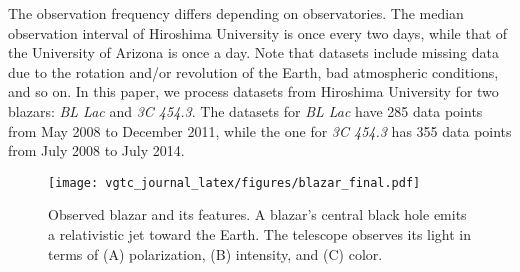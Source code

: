 The observation frequency differs depending on observatories.
The median observation interval of Hiroshima University is once every two days,
while that of the University of Arizona is once a day.
Note that datasets include missing data due to the rotation and/or revolution of the Earth, bad atmospheric conditions, and so on.
In this paper, we process datasets from Hiroshima University for two blazars: \emph{BL Lac} and \emph{3C 454.3}. 
The datasets for \emph{BL Lac} have 285 data points from May 2008 to December 2011, while the one for \emph{3C 454.3} has 355 data points from July 2008 to July 2014.


\begin{figure}[tb]
    \centering
        \texttt{[image: vgtc\_journal\_latex/figures/blazar\_final.pdf]}
    \caption{Observed blazar and its features. A blazar's central black hole emits a relativistic jet toward the Earth.
        The telescope observes its light in terms of (A) polarization, (B) intensity, and (C) color.}
    \label{fig:blazar}
\end{figure}

